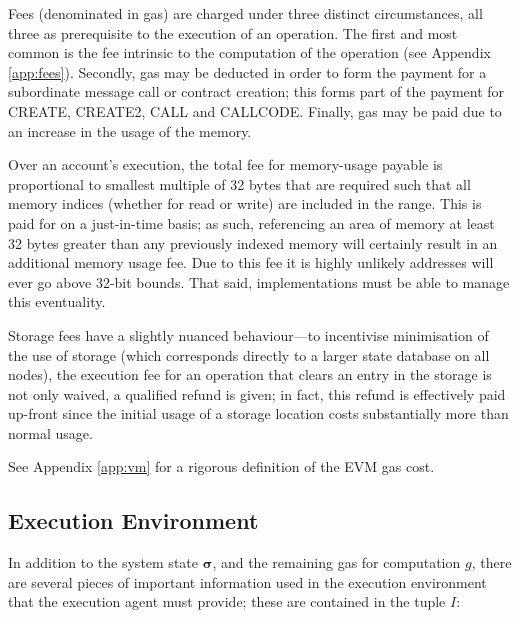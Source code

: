 \documentclass[9pt,oneside]{amsart}
\makeatletter
\newcommand{\linkdest}[1]{\Hy@raisedlink{\hypertarget{#1}{}}}
\makeatother
\begin{document}
\begin{multicols}{2}
Fees (denominated in gas) are charged under three distinct circumstances, all three as prerequisite to the execution of an operation. The first and most common is the fee intrinsic to the computation of the operation (see Appendix \ref{app:fees}). Secondly, gas may be deducted in order to form the payment for a subordinate message call or contract creation; this forms part of the payment for {\small CREATE}, {\small CREATE2}, {\small CALL} and {\small CALLCODE}. Finally, gas may be paid due to an increase in the usage of the memory.

Over an account's execution, the total fee for memory-usage payable is proportional to smallest multiple of 32 bytes that are required such that all memory indices (whether for read or write) are included in the range. This is paid for on a just-in-time basis; as such, referencing an area of memory at least 32 bytes greater than any previously indexed memory will certainly result in an additional memory usage fee. Due to this fee it is highly unlikely addresses will ever go above 32-bit bounds. That said, implementations must be able to manage this eventuality.

Storage fees have a slightly nuanced behaviour---to incentivise minimisation of the use of storage (which corresponds directly to a larger state database on all nodes), the execution fee for an operation that clears an entry in the storage is not only waived, a qualified refund is given; in fact, this refund is effectively paid up-front since the initial usage of a storage location costs substantially more than normal usage.

See Appendix \ref{app:vm} for a rigorous definition of the EVM gas cost.

\subsection{Execution Environment}\linkdest{exec_env}

In addition to the system state $\boldsymbol{\sigma}$, and the remaining gas for computation $g$, there are several pieces of important information used in the execution environment that the execution agent must provide; these are contained in the tuple $I$:


\end{multicols}
\end{document}
